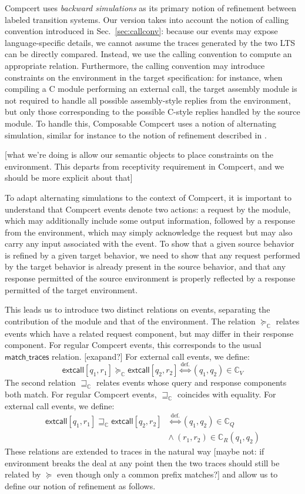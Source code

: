 \documentclass[sigplan,10pt,review,anonymous]{acmart}
\newcommand{\kw}[1]{\ensuremath{ \textsf{#1} }}
\begin{document}
Compcert uses \emph{backward simulations}
as its primary notion of refinement between labeled transition systems.
Our version takes into account the notion of calling convention
introduced in Sec.~\ref{sec:callconv}:
because our events may expose language-specific details,
we cannot assume the traces generated by the two LTS can be directly compared.
Instead,
we use the calling convention to compute an appropriate relation.
Furthermore,
the calling convention may introduce
constraints on the environment in the target specification:
for instance,
when compiling a C module performing an external call,
the target assembly module is not required to handle
all possible assembly-style replies from the environment,
but only those corresponding to the possible C-style replies
handled by the source module.
To handle this,
Composable Compcert uses a notion of alternating simulation,
similar for instance to the notion of refinement
described in \cite{gmos}.

[what we're doing
is allow our semantic objects
to place constraints on the environment.
This departs from receptivity requirement in Compcert,
and we should be more explicit about that]

To adapt alternating simulations to the context of Compcert,
it is important to understand that Compcert events
denote two actions:
a request by the module,
which may additionally include some output information,
followed by a response from the environment,
which may simply acknowledge the request
but may also carry any input associated with the event.
To show that
a given source behavior is refined by
a given target behavior,
we need to show that any request performed by the target behavior
is already present in the source behavior,
and that any response permitted of the source environment
is properly reflected by
a response permitted of the target environment.

This leads us to introduce two distinct relations on events,
separating the contribution of the module and that of the environment.
The relation $\succeq_\mathbb{C}$
relates events
which have a related request component,
but may differ in their response component.
For regular Compcert events,
this corresponds to the usual $\kw{match\_traces}$ relation.
[exapand?]
For external call events, we define:
\[
  \kw{extcall}[q_1, r_1] \succeq_\mathbb{C} \kw{extcall}[q_2, r_2]
  \stackrel{\text{def.}}{\Leftrightarrow}
  (q_1, q_2) \in \mathbb{C}_V
\]
The second relation $\sqsupseteq_\mathbb{C}$
relates events whose query and response components
both match.
For regular Compcert events,
$\sqsupseteq_\mathbb{C}$ coincides with equality.
For external call events, we define:
\begin{align*}
  \kw{extcall}[q_1, r_1] \sqsupseteq_\mathbb{C} \kw{extcall}[q_2, r_2]
  &\stackrel{\text{def.}}{\Leftrightarrow}
  (q_1, q_2) \in \mathbb{C}_Q \\ &\wedge \ 
  (r_1, r_2) \in \mathbb{C}_R(q_1, q_2)
\end{align*}
These relations are extended to traces in the natural way
[maybe not: if environment breaks the deal at any point
then the two traces should still be related by $\succeq$
even though only a common prefix matches?]
and allow us to define
our notion of refinement as follows.
\end{document}
